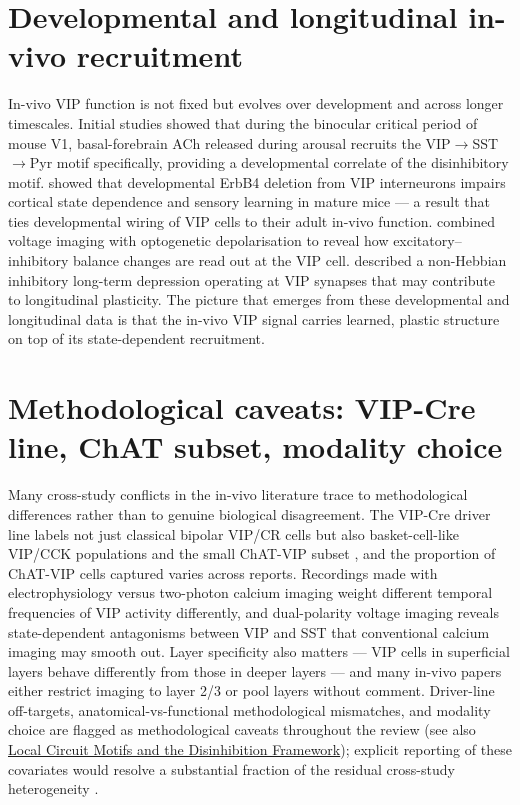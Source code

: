 \documentclass[11pt]{article}
\let\origrightarrow\rightarrow
\def\rightarrow{\ensuremath{\origrightarrow}}
\begin{document}
\section{Developmental and longitudinal in-vivo recruitment}

In-vivo VIP function is not fixed but evolves over development and across longer timescales. Initial studies \citep{Yaeger2019} showed that during the binocular critical period of mouse V1, basal-forebrain ACh released during arousal recruits the VIP\rightarrow SST\rightarrow Pyr motif specifically, providing a developmental correlate of the disinhibitory motif. \citet{Batistabrito2017} showed that developmental ErbB4 deletion from VIP interneurons impairs cortical state dependence and sensory learning in mature mice --- a result that ties developmental wiring of VIP cells to their adult in-vivo function. \citet{Yang2025} combined voltage imaging with optogenetic depolarisation to reveal how excitatory--inhibitory balance changes are read out at the VIP cell. \citet{Jabonska2026} described a non-Hebbian inhibitory long-term depression operating at VIP synapses that may contribute to longitudinal plasticity. The picture that emerges from these developmental and longitudinal data is that the in-vivo VIP signal carries learned, plastic structure on top of its state-dependent recruitment.

\section{Methodological caveats: VIP-Cre line, ChAT subset, modality choice}

Many cross-study conflicts in the in-vivo literature trace to methodological differences rather than to genuine biological disagreement. The VIP-Cre driver line labels not just classical bipolar VIP/CR cells but also basket-cell-like VIP/CCK populations and the small ChAT-VIP subset \citep{Obermayer2019, Dudai2020, Granger2020, Porter1999}, and the proportion of ChAT-VIP cells captured varies across reports. Recordings made with electrophysiology versus two-photon calcium imaging weight different temporal frequencies of VIP activity differently, and dual-polarity voltage imaging \citep{Kannan2022} reveals state-dependent antagonisms between VIP and SST that conventional calcium imaging may smooth out. Layer specificity also matters --- VIP cells in superficial layers behave differently from those in deeper layers --- and many in-vivo papers either restrict imaging to layer 2/3 or pool layers without comment. Driver-line off-targets, anatomical-vs-functional methodological mismatches, and modality choice are flagged as methodological caveats throughout the review (see also \href{/disinhibition-framework}{Local Circuit Motifs and the Disinhibition Framework}); explicit reporting of these covariates would resolve a substantial fraction of the residual cross-study heterogeneity \citep{Obermayer2019, Dudai2020, Kannan2022, Yavorska2021}.
\end{document}
